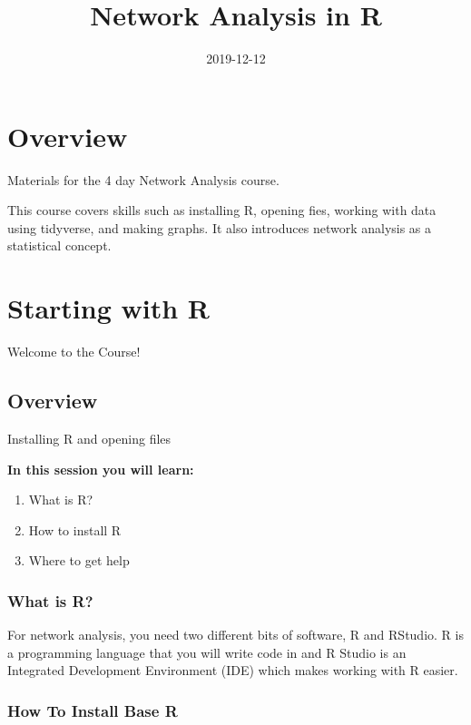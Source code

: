 \documentclass[]{book}
\title{Network Analysis in R}
\author{}
\date{2019-12-12}
\providecommand{\tightlist}{%
  \setlength{\itemsep}{0pt}\setlength{\parskip}{0pt}}
\begin{document}
\maketitle

{
\setcounter{tocdepth}{1}
\tableofcontents
}
\hypertarget{overview}{%
\chapter*{Overview}\label{overview}}

Materials for the 4 day Network Analysis course.

This course covers skills such as installing R, opening fies, working with data using tidyverse, and making graphs. It also introduces network analysis as a statistical concept.

\hypertarget{starting-with-r}{%
\chapter{Starting with R}\label{starting-with-r}}

{Welcome to the Course!}

\hypertarget{overview-1}{%
\section{Overview}\label{overview-1}}

Installing R and opening files

\textbf{In this session you will learn:}

\begin{enumerate}
\def\labelenumi{\arabic{enumi}.}
\tightlist
\item
  What is R?
\item
  How to install R
\item
  Where to get help
\end{enumerate}

\hypertarget{what-is-r}{%
\subsection{What is R?}\label{what-is-r}}

For network analysis, you need two different bits of software, R and RStudio. R is a programming language that you will write code in and R Studio is an Integrated Development Environment (IDE) which makes working with R easier.

\hypertarget{how-to-install-base-r}{%
\subsection{How To Install Base R}\label{how-to-install-base-r}}
\end{document}
